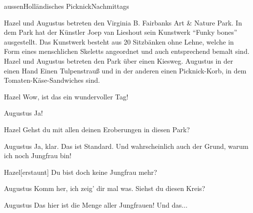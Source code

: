 \documentclass[12pt]{article}
\begin{document}
    \begin{scene}{aussen}{Holländisches Picknick}{Nachmittags}
        \begin{scenedescription}
            \gls{Hazel} und \gls{Augustus} betreten den Virginia B. Fairbanks Art \& Nature Park.
            In dem Park hat der Künstler Joep van Lieshout sein Kunstwerk ``Funky bones'' ausgestellt.
            Das Kunstwerk besteht aus 20 Sitzbänken ohne Lehne, welche in Form eines menschlichen Skeletts angeordnet und auch entsprechend bemalt sind.
            \gls{Hazel} und \gls{Augustus} betreten den Park über einen Kiesweg.
            \gls{Augustus} in der einen Hand Einen Tulpenstrauß und in der anderen einen Picknick-Korb, in dem Tomaten-Käse-Sandwiches sind.
        \end{scenedescription}

        \begin{dialog}{Hazel}
            Wow, ist das ein wundervoller Tag!
        \end{dialog}

        \begin{dialog}{Augustus}
            Ja!
        \end{dialog}

        \begin{dialog}{Hazel}
            Gehst du mit allen deinen Eroberungen in diesen Park?
        \end{dialog}

        \begin{dialog}{Augustus}
            Ja, klar.
            Das ist Standard.
            Und wahrscheinlich auch der Grund, warum ich noch Jungfrau bin!
        \end{dialog}

        \begin{dialog}{Hazel}[erstaunt]
            Du bist doch keine Jungfrau mehr?
        \end{dialog}

        \begin{dialog}{Augustus}
            Komm her, ich zeig' dir mal was.
            Siehst du diesen Kreis?
        \end{dialog}


        \begin{dialog}{Augustus}
            Das hier ist die Menge aller Jungfrauen!
            Und das...
        \end{dialog}


\end{scene}
\end{document}
